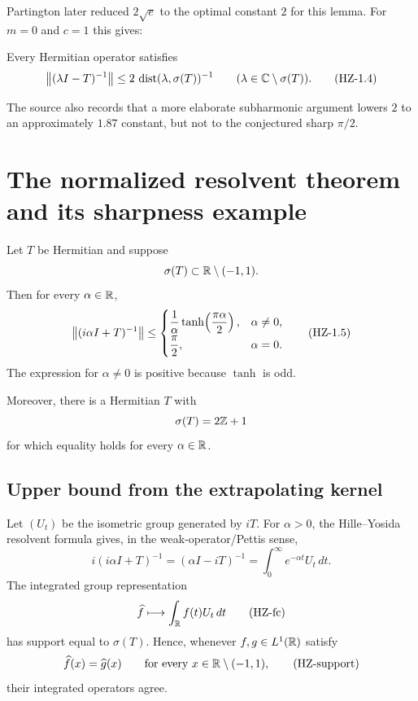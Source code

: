Partington later reduced $2\sqrt e$ to the optimal constant $2$ for this lemma. For $m=0$ and $c=1$ this gives:

\begin{corollary}
Every Hermitian operator satisfies
\[
  \left\lVert (\lambda I-T)^{-1}\right\rVert
  \le 2\,\operatorname{dist}(\lambda,\sigma(T))^{-1}
  \qquad(\lambda\in\mathbb{C}\setminus\sigma(T)).
  \tag{HZ-1.4}\label{HZ-1.4}
\]
\end{corollary}

The source also records that a more elaborate subharmonic argument lowers $2$ to an approximately $1.87$ constant, but not to the conjectured sharp $\pi/2$.

\section{The normalized resolvent theorem and its sharpness example}


\begin{theorem}
Let $T$ be Hermitian and suppose
\[
  \sigma(T)\subset\mathbb{R}\setminus(-1,1).
\]
Then for every $\alpha\in\mathbb{R}$,
\[
  \left\lVert (i\alpha I+T)^{-1}\right\rVert
  \le
  \begin{cases}
    \displaystyle \frac{1}{\alpha}\tanh\!\left(\frac{\pi\alpha}{2}\right),
      & \alpha\ne0,\\[1.1ex]
    \displaystyle \frac{\pi}{2},&\alpha=0.
  \end{cases}
  \tag{HZ-1.5}\label{HZ-1.5}
\]
The expression for $\alpha\ne0$ is positive because $\tanh$ is odd.

Moreover, there is a Hermitian $T$ with
\[
  \sigma(T)=2\mathbb{Z}+1
\]
for which equality holds for every $\alpha\in\mathbb{R}$.
\end{theorem}

\subsection{Upper bound from the extrapolating kernel}

Let $(U_t)$ be the isometric group generated by $iT$. For $\alpha>0$, the Hille--Yosida resolvent formula gives, in the weak-operator/Pettis sense,
\[
  i(i\alpha I+T)^{-1}
  =(\alpha I-iT)^{-1}
  =\int_0^\infty e^{-\alpha t}U_t\,dt.
  \tag{HZ-1.5-res}\label{HZ-1.5-res}
\]
The integrated group representation
\[
  \widehat f\longmapsto \int_{\mathbb{R}}f(t)U_t\,dt
  \tag{HZ-fc}\label{HZ-fc}
\]
has support equal to $\sigma(T)$. Hence, whenever $f,g\in L^1(\mathbb{R})$ satisfy
\[
  \widehat f(x)=\widehat g(x)
  \qquad\text{for every }x\in\mathbb{R}\setminus(-1,1),
  \tag{HZ-support}\label{HZ-support}
\]
their integrated operators agree.

